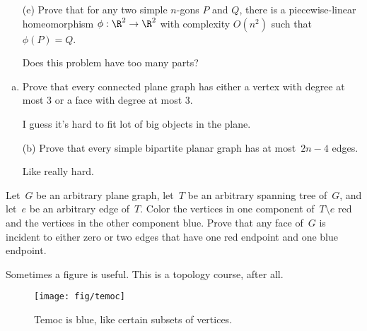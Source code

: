 \documentclass[11pt]{article}
\begin{document}
\begin{enumerate}[(a)]
  \item[(e)]
    Prove that for any two simple \(n\)-gons \(P\) and \(Q\), there is a piecewise-linear
    homeomorphism \(\phi : \R^2 \to \R^2\) with complexity \(O(n^2)\) such that \(\phi(P) = Q\).

\begin{solution}
  Does this problem have too many parts?
\end{solution}
\end{enumerate}

\begin{enumerate}[(a)]\itemsep0pt
  \item
    Prove that every connected plane graph has either a vertex with degree at most \(3\) or a face
    with degree at most \(3\).

\begin{solution}
  I guess it's hard to fit lot of big objects in the plane.
\end{solution}

  \item[(b)]
    Prove that every simple bipartite planar graph has at most~\(2n - 4\) edges.

\begin{solution}
  Like really hard.
\end{solution}
\end{enumerate}

Let~\(G\) be an arbitrary plane graph, let~\(T\) be an arbitrary spanning tree of~\(G\), and
let~\(e\) be an arbitrary edge of~\(T\).
Color the vertices in one component of~\(T \setminus e\) red and the vertices in the other
component blue.
Prove that any face of~\(G\) is incident to either zero or two edges that have one red endpoint
and one blue endpoint.

\begin{solution}
  Sometimes a figure is useful.
  This is a topology course, after all.
  \begin{figure}[h]
    \centering
    \texttt{[image: fig/temoc]}
    \caption{Temoc is blue, like certain subsets of vertices.}
    \label{fig:temoc}
  \end{figure}
\end{solution}
\end{document}
